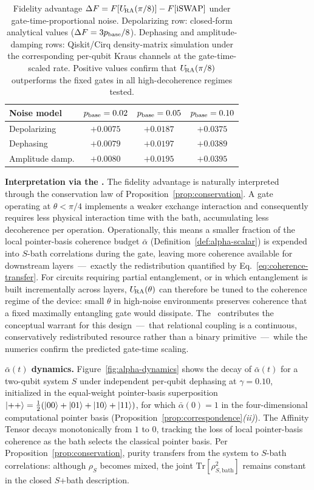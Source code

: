 \begin{table}[htbp]
\centering
\caption{Fidelity advantage $\Delta F = F[U_{\!\mathrm{RA}}(\pi/8)] - F[\mathrm{iSWAP}]$
under gate-time-proportional noise. Depolarizing row: closed-form
analytical values ($\Delta F = 3 p_{\rm base}/8$). Dephasing and
amplitude-damping rows: Qiskit/Cirq density-matrix simulation under
the corresponding per-qubit Kraus channels at the gate-time-scaled
rate. Positive values confirm that $U_{\!\mathrm{RA}}(\pi/8)$ outperforms the fixed
gates in all high-decoherence regimes tested.}
\label{tab:fidelity-all}
\begin{tabular}{lccc}
\toprule
Noise model & $p_{\rm base} = 0.02$ & $p_{\rm base} = 0.05$ & $p_{\rm base} = 0.10$ \\
\midrule
Depolarizing    & $+0.0075$ & $+0.0187$ & $+0.0375$ \\
Dephasing       & $+0.0079$ & $+0.0197$ & $+0.0389$ \\
Amplitude damp. & $+0.0080$ & $+0.0195$ & $+0.0395$ \\
\bottomrule
\end{tabular}
\end{table}

\textbf{Interpretation via the \RCT.}
The fidelity advantage is naturally interpreted through the
conservation law of Proposition~\ref{prop:conservation}.
A gate operating at $\theta < \pi/4$ implements a weaker exchange
interaction and consequently requires less physical interaction time
with the bath, accumulating less decoherence per operation.
Operationally, this means a smaller fraction of the local pointer-basis
coherence budget $\bar\alpha$ (Definition~\ref{def:alpha-scalar}) is
expended into $S$-bath correlations during the gate, leaving more
coherence available for downstream layers~---~exactly the redistribution
quantified by Eq.~\eqref{eq:coherence-transfer}.
For circuits requiring partial entanglement, or in which entanglement
is built incrementally across layers, $U_{\!\mathrm{RA}}(\theta)$ can therefore be
tuned to the coherence regime of the device: small $\theta$ in
high-noise environments preserves coherence that a fixed maximally
entangling gate would dissipate.
The \RCT~contributes the conceptual warrant for this design~---~that
relational coupling is a continuous, conservatively redistributed
resource rather than a binary primitive~---~while the numerics confirm
the predicted gate-time scaling.

\textbf{$\bar\alpha(t)$ dynamics.}
Figure~\ref{fig:alpha-dynamics} shows the decay of $\bar\alpha(t)$ for a
two-qubit system $S$ under independent per-qubit dephasing at
$\gamma = 0.10$, initialized in the equal-weight pointer-basis
superposition
$\ket{++} = \tfrac{1}{2}(\ket{00}+\ket{01}+\ket{10}+\ket{11})$, for
which $\bar\alpha(0) = 1$ in the four-dimensional computational pointer
basis (Proposition~\ref{prop:correspondence}\emph{(ii)}).
The Affinity Tensor decays monotonically from $1$ to $0$, tracking the
loss of local pointer-basis coherence as the bath selects the classical
pointer basis. Per
Proposition~\ref{prop:conservation}, purity transfers from the system
to $S$-bath correlations: although $\rho_S$ becomes mixed, the joint
$\mathrm{Tr}[\rho_{S,\mathrm{bath}}^2]$ remains constant in the closed
$S$+bath description.


